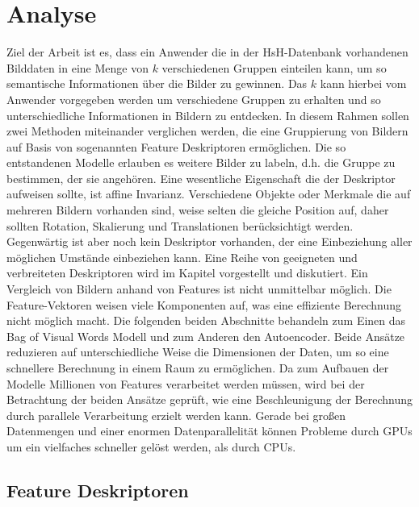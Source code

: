 \chapter{Analyse}

Ziel der Arbeit ist es, dass ein Anwender die in der HsH-Datenbank vorhandenen Bilddaten in eine Menge von $k$ verschiedenen Gruppen einteilen kann, um so semantische Informationen über die Bilder zu gewinnen. Das $k$ kann hierbei vom Anwender vorgegeben werden um verschiedene Gruppen zu erhalten und so unterschiedliche Informationen in Bildern zu entdecken. 
In diesem Rahmen sollen zwei Methoden miteinander verglichen werden, die eine Gruppierung von Bildern auf Basis von sogenannten Feature Deskriptoren ermöglichen.  Die so entstandenen Modelle erlauben es weitere Bilder zu labeln, d.h. die Gruppe zu bestimmen, der sie angehören. Eine wesentliche Eigenschaft die der Deskriptor aufweisen sollte, ist affine Invarianz. Verschiedene Objekte oder Merkmale die auf mehreren Bildern vorhanden sind, weise selten die gleiche Position auf, daher sollten Rotation, Skalierung und Translationen berücksichtigt werden. Gegenwärtig ist aber noch kein Deskriptor vorhanden, der eine Einbeziehung aller möglichen Umstände einbeziehen kann. Eine Reihe von geeigneten und verbreiteten Deskriptoren wird im Kapitel  vorgestellt und diskutiert.
Ein Vergleich von Bildern anhand von Features ist nicht unmittelbar möglich. Die Feature-Vektoren weisen viele Komponenten auf, was eine effiziente Berechnung nicht möglich macht. Die folgenden beiden Abschnitte behandeln zum Einen das Bag of Visual Words Modell und zum Anderen den Autoencoder. Beide Ansätze reduzieren auf unterschiedliche Weise die Dimensionen der Daten, um so eine schnellere Berechnung in einem  Raum zu ermöglichen.
Da zum Aufbauen der Modelle Millionen von Features verarbeitet werden müssen, wird bei der Betrachtung der beiden Ansätze geprüft, wie eine Beschleunigung der Berechnung durch parallele Verarbeitung erzielt werden kann. Gerade bei großen Datenmengen und einer enormen Datenparallelität können Probleme durch GPUs um ein vielfaches schneller gelöst werden, als durch CPUs.


\section{Feature Deskriptoren}
\label{extraction}

